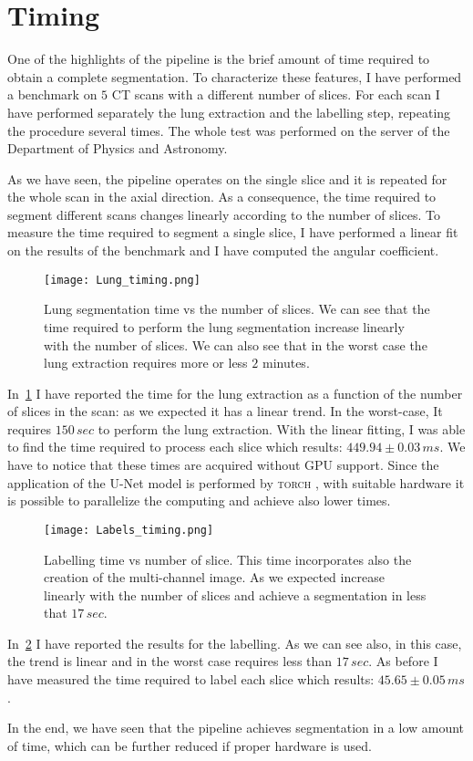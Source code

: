 \documentclass{standalone}
\begin{document}
	\section{Timing}
	

	One of the highlights of the pipeline is the brief amount of time required to obtain a complete segmentation. To characterize these features, I have performed a benchmark on $5$ CT scans with a different number of slices. For each scan I have performed separately the lung extraction and the labelling step, repeating the procedure several times. The whole test was performed on the server of the Department of Physics and Astronomy. 

	As we have seen, the pipeline operates on the single slice and it is repeated for the whole scan in the axial direction. As a consequence, the time required to segment different scans changes linearly according to the number of slices. To measure the time required to segment a single slice, I have performed a linear fit on the results of the benchmark and I have computed the angular coefficient. 
	 
	\begin{figure}[h!]
		\centering
			\texttt{[image: Lung\_timing.png]}
			\caption{Lung segmentation time vs the number of slices. We can see that the time required to perform the lung segmentation increase linearly with the number of slices. We can also see that in the worst case the lung extraction requires more or less $2$ minutes.}\label{fig:LungTime}
	\end{figure}

	In \figurename\,\ref{fig:LungTime} I have reported the time for the lung extraction as a function of the number of slices in the scan: as we expected it has a linear trend. In the worst-case, It requires $150\,sec$ to perform the lung extraction. With the linear fitting, I was able to find the time required to process each slice which results: $449.94\pm 0.03\,ms$. We have to notice that these times are acquired without GPU support. Since the application of the U-Net model is performed by \textsc{torch} , with suitable hardware it is possible to parallelize the computing and achieve also lower times.
		
	\begin{figure}[h!]
		\centering
		\texttt{[image: Labels\_timing.png]}
		\caption{Labelling time vs number of slice. This time incorporates also the creation of the multi-channel image. As we expected increase linearly with the number of slices and achieve a segmentation in less that $17\,sec$.}\label{fig:LabTime}
	\end{figure}

	In \figurename\,\ref{fig:LabTime} I have reported the results for the labelling. As we can see also, in this case, the trend is linear and in the worst case requires less than $17\,sec$. As before I have measured the time required to label each slice which results: $45.65\pm0.05\,ms$. 
	
	In the end, we have seen that the pipeline achieves segmentation in a low amount of time, which can be further reduced if proper hardware is used.
	
	 
	 
\end{document}
